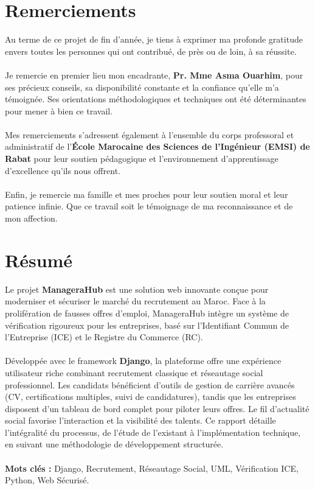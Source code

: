 \documentclass[12pt,a4paper]{report}
\begin{document}
\chapter*{Remerciements}
Au terme de ce projet de fin d'année, je tiens à exprimer ma profonde gratitude envers toutes les personnes qui ont contribué, de près ou de loin, à sa réussite. \\
\\
Je remercie en premier lieu mon encadrante, \textbf{Pr. Mme Asma Ouarhim}, pour ses précieux conseils, sa disponibilité constante et la confiance qu'elle m'a témoignée. Ses orientations méthodologiques et techniques ont été déterminantes pour mener à bien ce travail. \\
\\
Mes remerciements s'adressent également à l'ensemble du corps professoral et administratif de l'\textbf{École Marocaine des Sciences de l'Ingénieur (EMSI) de Rabat} pour leur soutien pédagogique et l'environnement d'apprentissage d'excellence qu'ils nous offrent. \\
\\
Enfin, je remercie ma famille et mes proches pour leur soutien moral et leur patience infinie. Que ce travail soit le témoignage de ma reconnaissance et de mon affection.
\newpage

\tableofcontents
\newpage

\chapter*{Résumé}
Le projet \textbf{ManageraHub} est une solution web innovante conçue pour moderniser et sécuriser le marché du recrutement au Maroc. Face à la prolifération de fausses offres d'emploi, ManageraHub intègre un système de vérification rigoureux pour les entreprises, basé sur l'Identifiant Commun de l'Entreprise (ICE) et le Registre du Commerce (RC). \\
\\
Développée avec le framework \textbf{Django}, la plateforme offre une expérience utilisateur riche combinant recrutement classique et réseautage social professionnel. Les candidats bénéficient d'outils de gestion de carrière avancés (CV, certifications multiples, suivi de candidatures), tandis que les entreprises disposent d'un tableau de bord complet pour piloter leurs offres. Le fil d'actualité social favorise l'interaction et la visibilité des talents. Ce rapport détaille l'intégralité du processus, de l'étude de l'existant à l'implémentation technique, en suivant une méthodologie de développement structurée. \\
\\
\textbf{Mots clés :} Django, Recrutement, Réseautage Social, UML, Vérification ICE, Python, Web Sécurisé.
\end{document}
